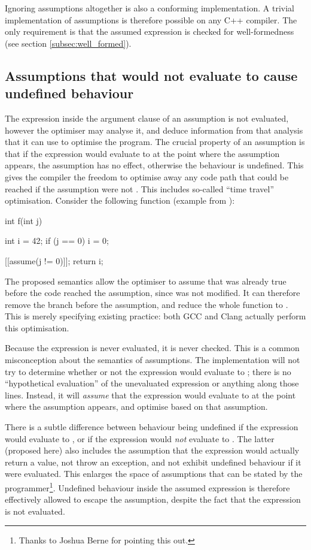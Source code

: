 Ignoring assumptions altogether is also a conforming implementation. A trivial implementation of assumptions is therefore possible on any C++ compiler. The only requirement is that the assumed expression is checked for well-formedness (see section \ref{subsec:well_formed}).

\subsection{Assumptions that would not evaluate to  cause undefined behaviour}

The expression inside the argument clause of an assumption is not evaluated, however the optimiser may analyse it, and deduce information from that analysis that it can use to optimise the program. The crucial property of an assumption is that if the expression would evaluate to  at the point where the assumption appears, the assumption has no effect, otherwise the behaviour is undefined. This gives the compiler the freedom to optimise away any code path that could be reached if the assumption were not . This includes so-called ``time travel'' optimisation. Consider the following function (example from \cite{P2064R0}):

\begin{codeblock}
int f(int j) {
  int i = 42;
  if (j == 0)
    i = 0;

  [[assume(j != 0)]];
  return i;
}
\end{codeblock}

The proposed semantics allow the optimiser to assume that  was already true before the code reached the assumption, since  was not modified. It can therefore remove the branch before the assumption, and reduce the whole function to . This is merely specifying existing practice: both GCC and Clang actually perform this optimisation.

Because the expression is never evaluated, it is never checked. This is a common misconception about the semantics of assumptions. The implementation will not try to determine whether or not the expression would evaluate to ; there is no ``hypothetical evaluation'' of the unevaluated expression or anything along those lines. Instead, it will \emph{assume} that the expression would evaluate to  at the point where the assumption appears, and optimise based on that assumption.

There is a subtle difference between behaviour being undefined if the expression would evaluate to , or if the expression would \emph{not} evaluate to . The latter (proposed here) also includes the assumption that the expression would actually return a value, not throw an exception, and not exhibit undefined behaviour if it were evaluated. This enlarges the space of assumptions that can be stated by the programmer\footnote{Thanks to Joshua Berne for pointing this out.}. Undefined behaviour inside the assumed expression is therefore effectively allowed to escape the assumption, despite the fact that the expression is not evaluated.

